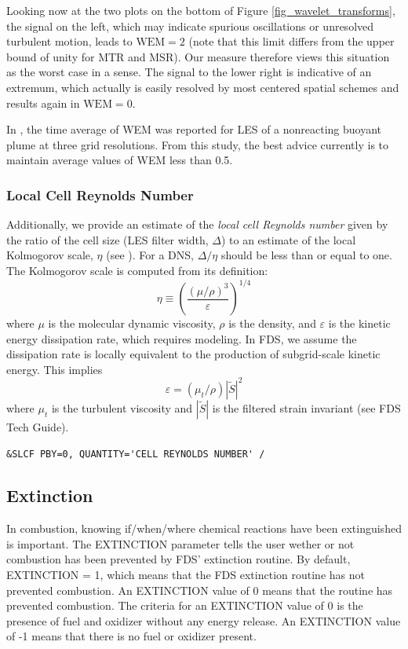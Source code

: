 \documentclass[11pt]{book}
\begin{document}
Looking now at the two plots on the bottom of Figure \ref{fig_wavelet_transforms}, the signal on the left, which may indicate spurious oscillations or unresolved turbulent motion, leads to $\mbox{WEM} = 2$ (note that this limit differs from the upper bound of unity for MTR and MSR).  Our measure therefore views this situation as the worst case in a sense.  The signal to the lower right is indicative of an extremum, which actually is easily resolved by most centered spatial schemes and results again in $\mbox{WEM}=0$.

In \cite{McDermott:2010}, the time average of WEM was reported for LES of a nonreacting buoyant plume at three grid resolutions.  From this study, the best advice currently is to maintain average values of WEM less than 0.5.

\subsubsection{Local Cell Reynolds Number}

Additionally, we provide an estimate of the \emph{local cell Reynolds number} given by the ratio of the cell size (LES filter width, $\Delta$) to an estimate of the local Kolmogorov scale, $\eta$ (see \cite{Pope:2000}).  For a DNS, $\Delta/\eta$ should be less than or equal to one. The Kolmogorov scale is computed from its definition:
\begin{equation}
\eta \equiv \left(\frac{(\mu/\rho)^3}{\varepsilon}\right)^{1/4}
\end{equation}
where $\mu$ is the molecular dynamic viscosity, $\rho$ is the density, and $\varepsilon$ is the kinetic energy dissipation rate, which requires modeling.  In FDS, we assume the dissipation rate is locally equivalent to the production of subgrid-scale kinetic energy.  This implies
\begin{equation}
\varepsilon = (\mu_t/\rho)|\tilde{S}|^2
\end{equation}
where $\mu_t$ is the turbulent viscosity and $|\tilde{S}|$ is the filtered strain invariant (see FDS Tech Guide).

\begin{lstlisting}
&SLCF PBY=0, QUANTITY='CELL REYNOLDS NUMBER' /
\end{lstlisting}

\subsection{Extinction}
\label{info:extinct_out}
In combustion, knowing if/when/where chemical reactions have been extinguished is important. The {\ct EXTINCTION} parameter tells the user wether or not combustion has been prevented by FDS' extinction routine. By default, {\ct EXTINCTION} = 1, which means that the FDS extinction routine has not prevented combustion. An {\ct EXTINCTION} value of 0 means that the routine has prevented combustion. The criteria for an {\ct EXTINCTION} value of 0 is the presence of fuel and oxidizer without any energy release. An {\ct EXTINCTION} value of -1 means that there is no fuel or oxidizer present.
\end{document}
